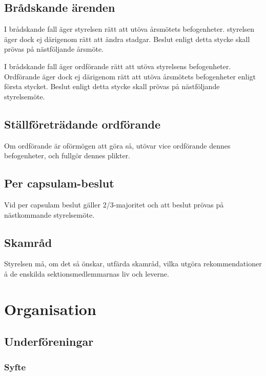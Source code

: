 \documentclass{dgovdoc}
\begin{document}
\subsection{Brådskande ärenden}

I brådskande fall äger styrelsen rätt att utöva årsmötets befogenheter.
styrelsen äger dock ej därigenom rätt att ändra stadgar. Beslut enligt detta stycke skall
prövas på nästföljande årsmöte.

I brådskande fall äger ordförande rätt att utöva styrelsens
befogenheter. Ordförande äger dock ej därigenom rätt att utöva årsmötets
befogenheter enligt första stycket. Beslut enligt detta stycke skall prövas på nästföljande styrelsemöte.

\subsection{Ställföreträdande ordförande}

Om ordförande är oförmögen att göra så, utövar vice ordförande
dennes befogenheter, och fullgör dennes plikter.

\subsection{Per capsulam-beslut}

Vid per capsulam beslut gäller 2/3-majoritet och att beslut prövas på
nästkommande styrelsemöte.

\subsection{Skamråd}

Styrelsen må, om det så önskar, utfärda skamråd, vilka utgöra
rekommendationer å de enskilda sektionsmedlemmarnas liv och leverne.

\section{Organisation}

\subsection{Underföreningar}
\label{sec:namnder}

\subsubsection{Syfte}
\end{document}
